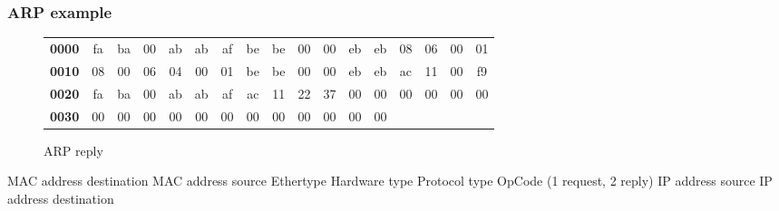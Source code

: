   \begin{frame}
    \frametitle{ARP example}
      \begin{figure}
      \centering
      \resizebox{11.5cm}{!} {
        \begin{tabular}{lcccccccccccccccc}
          \textbf{0000} & \color{red}fa & \color{red}ba & \color{red}00 & \color{red}ab & \color{red}ab & \color{red}af & \color{Marroon}be & \color{Marroon}be & \color{Marroon}00 & \color{Marroon}00 & \color{Marroon}eb & \color{Marroon}eb & \color{blue}08 & \color{blue}06 & \color{magenta}00 & \color{magenta}01 \\
          \textbf{0010} & \color{OliveGreen}08 & \color{OliveGreen}00 & \color{gray}06 & \color{gray}04 & \color{fuchsia}00 & \color{fuchsia}01 & \color{Marroon}be & \color{Marroon}be & \color{Marroon}00 & \color{Marroon}00 & \color{Marroon}eb & \color{Marroon}eb & \color{brown}ac & \color{brown}11 & \color{brown}00 & \color{brown}f9 \\
          \textbf{0020} & \color{red}fa & \color{red}ba & \color{red}00 & \color{red}ab & \color{red}ab & \color{red}af & \color{orange}ac & \color{orange}11 & \color{orange}22 & \color{orange}37 & 00 & 00 & 00 & 00 & 00 & 00 \\
          \textbf{0030} & 00 & 00 & 00 & 00 & 00 & 00 & 00 & 00 & 00 & 00 & 00 & 00 \\
        \end{tabular}
      }
      \caption{ARP reply}
      \label{fig:arp_rep_ex-colored}
    \end{figure}
    \color{red}MAC address destination \color{Marroon}MAC address source \color{blue}Ethertype \color{magenta}Hardware type \color{OliveGreen}Protocol type \color{fuchsia}OpCode (1 request, 2 reply) \color{brown} IP address source \color{orange} IP address destination
  \end{frame}
